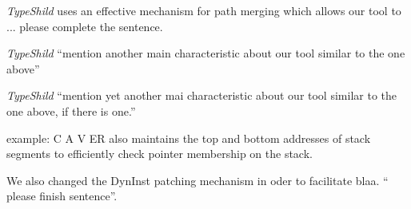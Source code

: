 \textit{TypeShild} uses an effective mechanism for path merging which allows
our tool to ... please complete the sentence.

\textit{TypeShild} ``mention another main characteristic about our tool similar to the one above''

\textit{TypeShild} ``mention yet another mai characteristic about our tool similar to the one above, if there is one.''

example: C A V ER also maintains the
top and bottom addresses of stack segments to efficiently
check pointer membership on the stack. 

We also changed the DynInst patching mechanism in oder to facilitate blaa. `` please finish sentence''.



